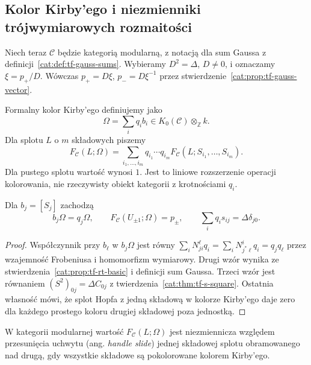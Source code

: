 \subsection{Kolor Kirby'ego i niezmienniki trójwymiarowych rozmaitości}

Niech teraz $\mathcal C$ będzie kategorią modularną, z notacją dla sum Gaussa z definicji~\ref{cat:def:tf-gauss-sums}. Wybieramy $D^2=\Delta$, $D\neq0$, i oznaczamy $\xi=p_+/D$. Wówczas $p_+=D\xi$, $p_-=D\xi^{-1}$ przez stwierdzenie~\ref{cat:prop:tf-gauss-vector}.

\begin{definicja}\label{cat:def:tf-kirby-color}
Formalny kolor Kirby'ego definiujemy jako
\[
 \Omega=\sum_i q_i b_i\in K_0(\mathcal C)\otimes_{\mathbb Z} k.
\]
Dla splotu $L$ o $m$ składowych piszemy
\[
 F_{\mathcal C}(L;\Omega)
 =\sum_{i_1,\ldots,i_m}
 q_{i_1}\cdots q_{i_m}
 F_{\mathcal C}(L;S_{i_1},\ldots,S_{i_m}).
\]
Dla pustego splotu wartość wynosi $1$. Jest to liniowe rozszerzenie operacji kolorowania, nie rzeczywisty obiekt kategorii z krotnościami $q_i$.
\end{definicja}

\begin{stwierdzenie}\label{cat:prop:tf-kirby-omega}
Dla $b_j=[S_j]$ zachodzą
\[
 b_j\Omega=q_j\Omega,\qquad
 F_{\mathcal C}(U_{\pm1};\Omega)=p_\pm,\qquad
 \sum_i q_i s_{ij}=\Delta\delta_{j0}.
\]
\end{stwierdzenie}
\begin{proof}
Współczynnik przy $b_\ell$ w $b_j\Omega$ jest równy
$\sum_i N_{ji}^{\ell}q_i=\sum_i N_{j^*\ell}^{i}q_i=q_jq_\ell$
przez wzajemność Frobeniusa i homomorfizm wymiarowy. Drugi wzór wynika ze stwierdzenia~\ref{cat:prop:tf-rt-basic} i definicji sum Gaussa. Trzeci wzór jest równaniem $(S^2)_{0j}=\Delta C_{0j}$ z twierdzenia~\ref{cat:thm:tf-s-square}. Ostatnia własność mówi, że splot Hopfa z jedną składową w kolorze Kirby'ego daje zero dla każdego prostego koloru drugiej składowej poza jednostką.
\end{proof}

\begin{twierdzenie}\label{cat:thm:tf-kirby-slide}
W kategorii modularnej wartość $F_{\mathcal C}(L;\Omega)$ jest niezmiennicza względem przesunięcia uchwytu (ang. \emph{handle slide}) jednej składowej splotu obramowanego nad drugą, gdy wszystkie składowe są pokolorowane kolorem Kirby'ego.
\end{twierdzenie}

